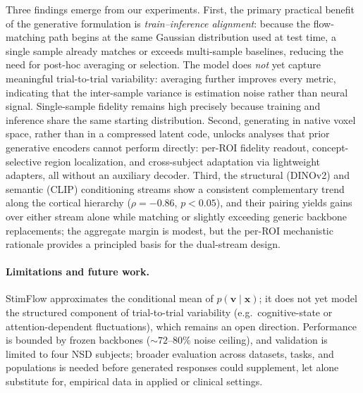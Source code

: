 \documentclass[runningheads]{llncs}
\begin{document}
Three findings emerge from our experiments.
First, the primary practical benefit of the generative formulation is
\emph{train--inference alignment}: because the flow-matching path begins at the same
Gaussian distribution used at test time, a single sample already matches or exceeds
multi-sample baselines, reducing the need for post-hoc averaging or selection.
The model does \emph{not} yet capture meaningful trial-to-trial variability:
averaging further improves every metric, indicating that the inter-sample variance is
estimation noise rather than neural signal.
Single-sample fidelity remains high precisely because training and inference share the
same starting distribution.
Second, generating in native voxel space, rather than in a compressed latent code,
unlocks analyses that prior generative encoders cannot perform directly: per-ROI fidelity
readout, concept-selective region localization, and cross-subject adaptation via
lightweight adapters, all without an auxiliary decoder.
Third, the structural (DINOv2) and semantic (CLIP) conditioning streams show a
consistent complementary trend along the cortical hierarchy ($\rho = -0.86$,
$p < 0.05$), and their pairing yields gains over either stream alone while
matching or slightly exceeding generic backbone replacements; the aggregate margin
is modest, but the per-ROI mechanistic rationale provides a principled basis for
the dual-stream design.

\paragraph{Limitations and future work.}
StimFlow approximates the conditional mean of $p(\mathbf{v}\mid\mathbf{x})$; it does not
yet model the structured component of trial-to-trial variability (e.g.\ cognitive-state
or attention-dependent fluctuations), which remains an open direction.
Performance is bounded by frozen backbones (${\sim}72$--$80\%$ noise ceiling), and
validation is limited to four NSD subjects; broader evaluation across datasets, tasks,
and populations is needed before generated responses could supplement,
let alone substitute for, empirical data in applied or clinical settings.

%
%


\end{document}

